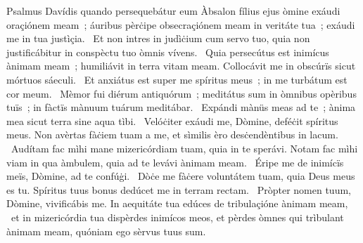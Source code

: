 { Psalmus Davídis quando persequebátur eum Àbsalon fílius ejus}
{%
òmine exáudi oraçiónem meam~; áuribus pèrċipe obsecraçiónem meam in veritáte tua~; exáudi me in tua justìçia. 
~Et non intres in judìċium cum servo tuo, quia non justificábitur in conspèctu tuo òmnis vívens. 
~Quia persecútus est inimícus ànimam meam~; humiliávit in terra vitam meam. Collocávit me in obscúrïs sicut mórtuos sáeculi. 
~Et anxiátus est super me spíritus meus~; in me turbátum est cor meum. 
~Mèmor fui diérum antiquórum~; meditátus sum in òmnibus opèribus tuïs~; in fàctïs mànuum tuárum meditábar. 
~Expándi mànüs meas ad te~; ànima mea sicut terra sine aqua tìbi. 
~Velóċiter exáudi me, Dòmine, deféċit spíritus meus. Non avèrtas fàċiem tuam a me, et sìmilis èro desċendèntibus in lacum. 
~Audítam fac mìhi mane mizericórdiam tuam, quia in te sperávi. Notam fac mìhi viam in qua àmbulem, quia ad te levávi ànimam meam. 
~Éripe me de inimícïs meïs, Dòmine, ad te confúġi. 
~Dòċe me fàċere voluntátem tuam, quia Deus meus es tu. Spíritus tuus bonus dedúcet me in terram rectam. 
~Pròpter nomen tuum, Dòmine, vivificábis me. In aequitáte tua edúces de tribulaçióne ànimam meam, 
~et in mizericórdia tua dispèrdes inimícos meos, et pèrdes òmnes qui trìbulant ànimam meam, quóniam ego sèrvus tuus sum. 
}
